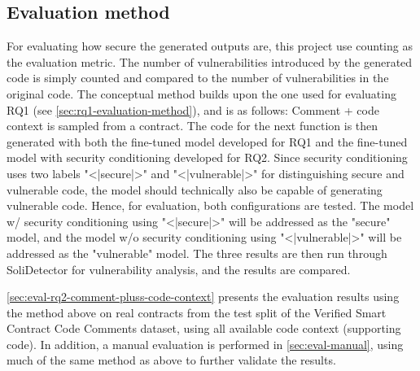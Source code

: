 \subsection{Evaluation method}
\label{sec:rq2-evaluation-method}
For evaluating how secure the generated outputs are, this project use counting as the evaluation metric. The number of vulnerabilities introduced by the generated code is simply counted and compared to the number of vulnerabilities in the original code. The conceptual method builds upon the one used for evaluating RQ1 (see \cref{sec:rq1-evaluation-method}), and is as follows:
Comment + code context is sampled from a contract. The code for the next function is then generated with both the fine-tuned model developed for RQ1 and the fine-tuned model with security conditioning developed for RQ2. Since security conditioning uses two labels "<|secure|>" and "<|vulnerable|>" for distinguishing secure and vulnerable code, the model should technically also be capable of generating vulnerable code. Hence, for evaluation, both configurations are tested. The model w/ security conditioning using "<|secure|>" will be addressed as the "secure" model, and the model w/o security conditioning using "<|vulnerable|>" will be addressed as the "vulnerable" model. The three results are then run through SoliDetector for vulnerability analysis, and the results are compared.

\cref{sec:eval-rq2-comment-pluss-code-context} presents the evaluation results using the method above on real contracts from the test split of the Verified Smart Contract Code Comments dataset, using all available code context (supporting code). In addition, a manual evaluation is performed in \cref{sec:eval-manual}, using much of the same method as above to further validate the results.


